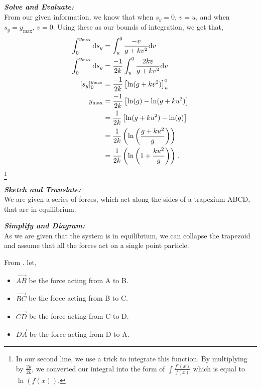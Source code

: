 \begin{subquestions}
\textbf{\textit{Solve and Evaluate:}} \\
From our given information, we know that when $s_y=0$, $v=u$, and when $s_y=y_{\text{max}}$, $v=0$. Using these as our bounds of integration, we get that,
\begin{align}
	\int_{0}^{y_{\text{max}}} \mathrm{d} s_y & = \int_{u}^{0} \frac{-v}{g+kv^2}\mathrm{d} v \nonumber \\
	\int_{0}^{y_{\text{max}}} \mathrm{d} s_y & = \frac{-1}{2k}\int_{u}^{0} \frac{2kv}{g+kv^2}\mathrm{d} v \nonumber \\
	\left[s_y\right]_0^{y_{\text{max}}} & = \frac{-1}{2k} \left[\ln(g+kv^2)\right]_u^0 \nonumber \\
	y_{\text{max}} & = \frac{-1}{2k} \left[\ln(g)-\ln(g+ku^2)\right] \nonumber \\
	               & = \frac{1}{2k} \left[\ln(g+ku^2)-\ln(g)\right] \nonumber \\
	               & = \frac{1}{2k} \left(\ln\left(\frac{g+ku^2}{g}\right)\right) \nonumber \\
	 			   & = \frac{1}{2k} \left(\ln\left(1 + \frac{ku^2}{g}\right)\right) \,.
\end{align} \footnote{In our second line, we use a trick to integrate this function. By multiplying by $\frac{2k}{2k}$, we converted our integral into the form of $\int \frac{f'(x)}{f(x)}$ which is equal to $\ln(f(x))$.} \\


\subquestion

\textbf{\textit{Sketch and Translate:}} \\
We are given a series of forces, which act along the sides of a trapezium ABCD, that are in equilibrium.



\textbf{\textit{Simplify and Diagram:}} \\ 
As we are given that the system is in equilibrium, we can collapse the trapezoid and assume that all the forces act on a single point particle.

From . let,
\begin{itemize}
	\item $\vec{AB}$ be the force acting from A to B.
	\item $\vec{BC}$ be the force acting from B to C.
	\item $\vec{CD}$ be the force acting from C to D.
	\item $\vec{DA}$ be the force acting from D to A.
\end{itemize}


\end{subquestions}
